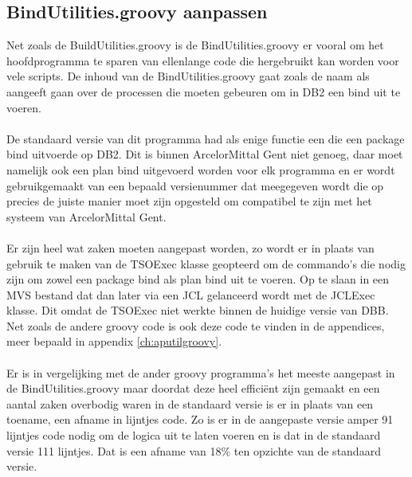 \subsection{BindUtilities.groovy aanpassen}
Net zoals de BuildUtilities.groovy is de BindUtilities.groovy er vooral om het hoofdprogramma te sparen van ellenlange code die hergebruikt kan worden voor vele scripts. De inhoud van de BindUtilities.groovy gaat zoals de naam als aangeeft gaan over de processen die moeten gebeuren om in DB2 een bind uit te voeren. 
\\ \\
De standaard versie van dit programma had als enige functie een die een package bind uitvoerde op DB2. Dit is binnen ArcelorMittal Gent niet genoeg, daar moet namelijk ook een plan bind uitgevoerd worden voor elk programma en er wordt gebruikgemaakt van een bepaald versienummer dat meegegeven wordt die op precies de juiste manier moet zijn opgesteld om compatibel te zijn met het systeem van ArcelorMittal Gent.
\\ \\
Er zijn heel wat zaken moeten aangepast worden, zo wordt er in plaats van gebruik te maken van de TSOExec klasse geopteerd om de commando's die nodig zijn om zowel een package bind als plan bind uit te voeren. Op te slaan in een MVS bestand dat dan later via een JCL gelanceerd wordt met de JCLExec klasse. Dit omdat de TSOExec niet werkte binnen de huidige versie van DBB. Net zoals de andere groovy code is ook deze code te vinden in de appendices, meer bepaald in appendix \ref{ch:aputilgroovy}. 
\\ \\
Er is in vergelijking met de ander groovy programma's het meeste aangepast in de BindUtilities.groovy maar doordat deze heel efficiënt zijn gemaakt en een aantal zaken overbodig waren in de standaard versie is er in plaats van een toename, een afname in lijntjes code. Zo is er in de aangepaste versie amper 91 lijntjes code nodig om de logica uit te laten voeren en is dat in de standaard versie 111 lijntjes. Dat is een afname van 18\% ten opzichte van de standaard versie. 

